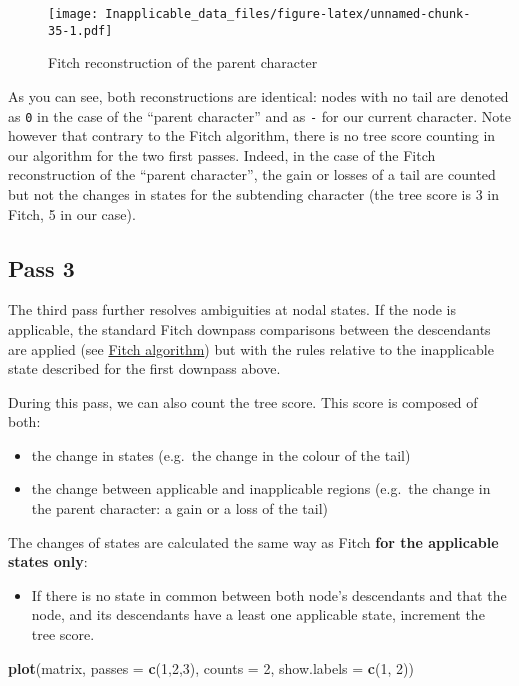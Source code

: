 \documentclass[]{book}
\newenvironment{Shaded}{\begin{snugshade}}{\end{snugshade}}
\newcommand{\KeywordTok}[1]{\textcolor[rgb]{0.13,0.29,0.53}{\textbf{#1}}}
\newcommand{\DataTypeTok}[1]{\textcolor[rgb]{0.13,0.29,0.53}{#1}}
\newcommand{\DecValTok}[1]{\textcolor[rgb]{0.00,0.00,0.81}{#1}}
\newcommand{\NormalTok}[1]{#1}
\providecommand{\tightlist}{%
  \setlength{\itemsep}{0pt}\setlength{\parskip}{0pt}}
\theoremstyle{definition}
\theoremstyle{definition}
\theoremstyle{definition}
\theoremstyle{remark}
\begin{document}
\begin{figure}
\centering
\texttt{[image: Inapplicable\_data\_files/figure-latex/unnamed-chunk-35-1.pdf]}
\caption{\label{fig:unnamed-chunk-35}Fitch reconstruction of the parent
character}
\end{figure}

As you can see, both reconstructions are identical: nodes with no tail
are denoted as \texttt{0} in the case of the ``parent character'' and as
\texttt{-} for our current character. Note however that contrary to the
Fitch algorithm, there is no tree score counting in our algorithm for
the two first passes. Indeed, in the case of the Fitch reconstruction of
the ``parent character'', the gain or losses of a tail are counted but
not the changes in states for the subtending character (the tree score
is 3 in Fitch, 5 in our case).

\subsection{Pass 3}\label{pass-3}

The third pass further resolves ambiguities at nodal states. If the node
is applicable, the standard Fitch downpass comparisons between the
descendants are applied (see \protect\hyperlink{fitch}{Fitch algorithm})
but with the rules relative to the inapplicable state described for the
first downpass above.

During this pass, we can also count the tree score. This score is
composed of both:

\begin{itemize}
\tightlist
\item
  the change in states (e.g.~the change in the colour of the tail)
\item
  the change between applicable and inapplicable regions (e.g.~the
  change in the parent character: a gain or a loss of the tail)
\end{itemize}

The changes of states are calculated the same way as Fitch \textbf{for
the applicable states only}:

\begin{itemize}
\tightlist
\item
  If there is no state in common between both node's descendants and
  that the node, and its descendants have a least one applicable state,
  increment the tree score.
\end{itemize}

\begin{Shaded}
\begin{Highlighting}[]
\KeywordTok{plot}\NormalTok{(matrix, }\DataTypeTok{passes =} \KeywordTok{c}\NormalTok{(}\DecValTok{1}\NormalTok{,}\DecValTok{2}\NormalTok{,}\DecValTok{3}\NormalTok{), }\DataTypeTok{counts =} \DecValTok{2}\NormalTok{, }\DataTypeTok{show.labels =} \KeywordTok{c}\NormalTok{(}\DecValTok{1}\NormalTok{, }\DecValTok{2}\NormalTok{))}
\end{Highlighting}
\end{Shaded}
\end{document}
